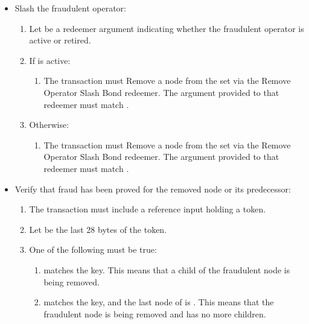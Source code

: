 \documentclass[../midgard.tex]{subfiles}
\begin{document}
\begin{description}
\begin{itemize}
        \item Slash the fraudulent operator:
        \begin{enumerate}[resume]
            \item Let  be a redeemer argument indicating whether the fraudulent operator is active or retired.
            \item If  is active:
                \begin{enumerate}
                    \item The transaction must Remove a node from the  set via the Remove Operator Slash Bond redeemer.
                      The  argument provided to that redeemer must match .
                \end{enumerate}
            \item Otherwise:
                \begin{enumerate}
                    \item The transaction must Remove a node from the  set via the Remove Operator Slash Bond redeemer.
                      The  argument provided to that redeemer must match .
                \end{enumerate}
        \end{enumerate}

        \item Verify that fraud has been proved for the removed node or its predecessor:
        \begin{enumerate}[resume]
            \item The transaction must include a reference input holding a  token.
            \item Let  be the last 28 bytes of the  token.
            \item One of the following must be true:
                \begin{enumerate}
                    \item {} matches the  key.
                      This means that a child of the fraudulent node is being removed.
                    \item {} matches the  key, and the last node of  is .
                      This means that the fraudulent node is being removed and has no more children.
                \end{enumerate}
        \end{enumerate}
    \end{itemize}
\end{description}
\end{document}

